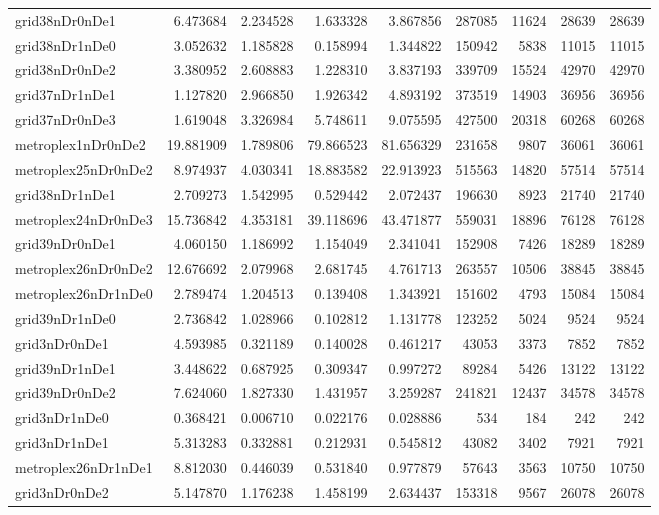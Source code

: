 \begin{longtable}{|l|r|r|r|r|r|r|r|r|}
grid38nDr0nDe1 & 6.473684 & 2.234528 & 1.633328 & 3.867856 & 287085 & 11624 & 28639 & 28639 \\
grid38nDr1nDe0 & 3.052632 & 1.185828 & 0.158994 & 1.344822 & 150942 & 5838 & 11015 & 11015 \\
grid38nDr0nDe2 & 3.380952 & 2.608883 & 1.228310 & 3.837193 & 339709 & 15524 & 42970 & 42970 \\
grid37nDr1nDe1 & 1.127820 & 2.966850 & 1.926342 & 4.893192 & 373519 & 14903 & 36956 & 36956 \\
grid37nDr0nDe3 & 1.619048 & 3.326984 & 5.748611 & 9.075595 & 427500 & 20318 & 60268 & 60268 \\
metroplex1nDr0nDe2 & 19.881909 & 1.789806 & 79.866523 & 81.656329 & 231658 & 9807 & 36061 & 36061 \\
metroplex25nDr0nDe2 & 8.974937 & 4.030341 & 18.883582 & 22.913923 & 515563 & 14820 & 57514 & 57514 \\
grid38nDr1nDe1 & 2.709273 & 1.542995 & 0.529442 & 2.072437 & 196630 & 8923 & 21740 & 21740 \\
metroplex24nDr0nDe3 & 15.736842 & 4.353181 & 39.118696 & 43.471877 & 559031 & 18896 & 76128 & 76128 \\
grid39nDr0nDe1 & 4.060150 & 1.186992 & 1.154049 & 2.341041 & 152908 & 7426 & 18289 & 18289 \\
metroplex26nDr0nDe2 & 12.676692 & 2.079968 & 2.681745 & 4.761713 & 263557 & 10506 & 38845 & 38845 \\
metroplex26nDr1nDe0 & 2.789474 & 1.204513 & 0.139408 & 1.343921 & 151602 & 4793 & 15084 & 15084 \\
grid39nDr1nDe0 & 2.736842 & 1.028966 & 0.102812 & 1.131778 & 123252 & 5024 & 9524 & 9524 \\
grid3nDr0nDe1 & 4.593985 & 0.321189 & 0.140028 & 0.461217 & 43053 & 3373 & 7852 & 7852 \\
grid39nDr1nDe1 & 3.448622 & 0.687925 & 0.309347 & 0.997272 & 89284 & 5426 & 13122 & 13122 \\
grid39nDr0nDe2 & 7.624060 & 1.827330 & 1.431957 & 3.259287 & 241821 & 12437 & 34578 & 34578 \\
grid3nDr1nDe0 & 0.368421 & 0.006710 & 0.022176 & 0.028886 & 534 & 184 & 242 & 242 \\
grid3nDr1nDe1 & 5.313283 & 0.332881 & 0.212931 & 0.545812 & 43082 & 3402 & 7921 & 7921 \\
metroplex26nDr1nDe1 & 8.812030 & 0.446039 & 0.531840 & 0.977879 & 57643 & 3563 & 10750 & 10750 \\
grid3nDr0nDe2 & 5.147870 & 1.176238 & 1.458199 & 2.634437 & 153318 & 9567 & 26078 & 26078 \\

\end{longtable}
